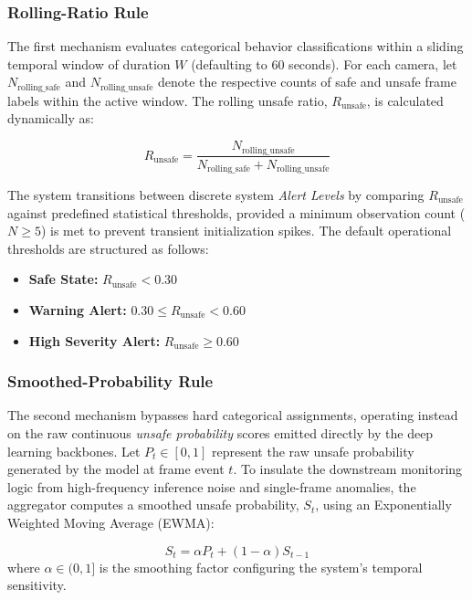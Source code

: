 \documentclass[conference]{IEEEtran}
\begin{document}
\subsubsection{Rolling-Ratio Rule}
The first mechanism evaluates categorical behavior classifications within a sliding temporal window of duration $W$ (defaulting to 60 seconds). For each camera, let $N_{\mathrm{rolling\_safe}}$ and $N_{\mathrm{rolling\_unsafe}}$ denote the respective counts of safe and unsafe frame labels within the active window. The rolling unsafe ratio, $R_{\mathrm{unsafe}}$, is calculated dynamically as:

\begin{equation}
R_{\mathrm{unsafe}} = \frac{N_{\mathrm{rolling\_unsafe}}}{N_{\mathrm{rolling\_safe}} + N_{\mathrm{rolling\_unsafe}}}
\label{eq:rolling-unsafe-ratio}
\end{equation}

The system transitions between discrete system \textit{Alert Levels} by comparing $R_{\mathrm{unsafe}}$ against predefined statistical thresholds, provided a minimum observation count ($N \ge 5$) is met to prevent transient initialization spikes. The default operational thresholds are structured as follows:
\begin{itemize}
    \item \textbf{Safe State:} $R_{\mathrm{unsafe}} < 0.30$
    \item \textbf{Warning Alert:} $0.30 \le R_{\mathrm{unsafe}} < 0.60$
    \item \textbf{High Severity Alert:} $R_{\mathrm{unsafe}} \ge 0.60$
\end{itemize}

\subsubsection{Smoothed-Probability Rule}
The second mechanism bypasses hard categorical assignments, operating instead on the raw continuous \textit{unsafe probability} scores emitted directly by the deep learning backbones. Let $P_t \in [0, 1]$ represent the raw unsafe probability generated by the model at frame event $t$. To insulate the downstream monitoring logic from high-frequency inference noise and single-frame anomalies, the aggregator computes a smoothed unsafe probability, $S_t$, using an Exponentially Weighted Moving Average (EWMA):

\begin{equation}
S_t = \alpha P_t + (1 - \alpha)S_{t-1}
\label{eq:ewma}
\end{equation}
where $\alpha \in (0, 1]$ is the smoothing factor configuring the system's temporal sensitivity. 
\end{document}
